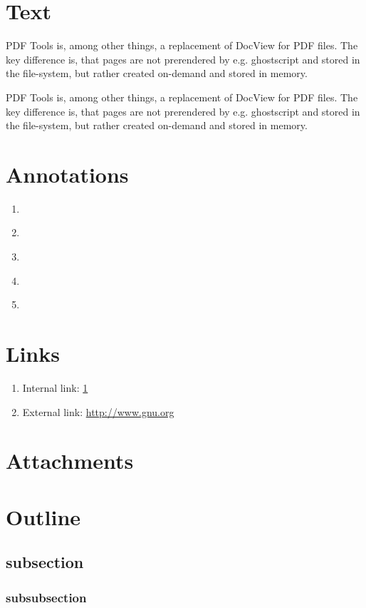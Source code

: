\documentclass{article}
\begin{document}
\section{Text}

\label{sec:text}
PDF Tools is, among other things, a replacement of DocView for PDF
files.  The key difference is, that pages are not prerendered by
e.g. ghostscript and stored in the file-system, but rather created
on-demand and stored in memory.

PDF Tools is, among other things, a replacement of DocView for PDF
files.  The key difference is, that pages are not prerendered by
e.g. ghostscript and stored in the file-system, but rather created
on-demand and stored in memory.
\newpage

\section{Annotations}

\label{sec:annotations}
\begin{enumerate}
\item {} \\
\item {} \\
\item {} \\
\item {} \\
\item {} \\
\end{enumerate}
\newpage

\section{Links}

\label{sec:links}

\begin{enumerate}
\item Internal link: \ref{sec:text}
\item External link: \url{http://www.gnu.org}
\end{enumerate}
\newpage

\section{Attachments}

\label{sec:attachments}

\newpage
\section{Outline}

\label{sec:outline}
\subsection{subsection}
\subsubsection{subsubsection}
\end{document}
